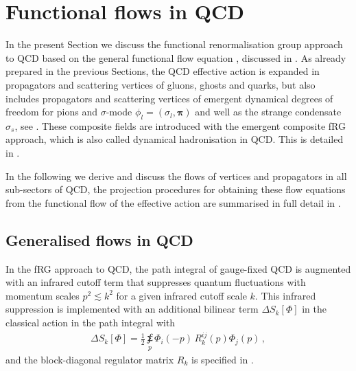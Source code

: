 \documentclass[aps,twocolumn,prd,superscriptaddress]{revtex4-2}
\begin{document}
\section{Functional flows in QCD} 
\label{sec:FunFlowsQCD}

In the present Section we discuss the functional renormalisation group approach to QCD based on the general functional flow equation , discussed in . As already prepared in the previous Sections, the QCD effective action is expanded in propagators and scattering vertices of gluons, ghosts and quarks, but also includes propagators and scattering vertices of emergent dynamical degrees of freedom for pions and $\sigma$-mode $\phi_l= (\sigma_l,\boldsymbol{\pi})$ and well as the strange condensate $\sigma_s$, see . These composite fields are introduced with the emergent composite fRG approach, which is also called dynamical hadronisation in QCD. This is detailed in . 

In the following we derive and discuss the flows of vertices and propagators in all sub-sectors of QCD, the projection procedures for obtaining these flow equations from the functional flow  of the effective action are summarised in full detail in . 


\subsection{Generalised flows in QCD}
\label{sec:GenflowsQCD}

In the fRG approach to QCD, the path integral of gauge-fixed QCD is augmented with an infrared cutoff term that suppresses quantum fluctuations with momentum scales $p^2\lesssim k^2$ for a given infrared cutoff scale $k$. This infrared suppression is implemented with an additional bilinear term $\Delta S_k[\Phi]$ in the classical action in the path integral with 
%
\begin{align}
\Delta S_k[\Phi]= \frac12 \sumint\limits_p \Phi_i(-p)\,R^{ij}_k(p) \Phi_j(p)\,,  
\label{eq:CutoffTerm}
\end{align}
%
and the block-diagonal regulator matrix $R_k$ is specified in . 
\end{document}
